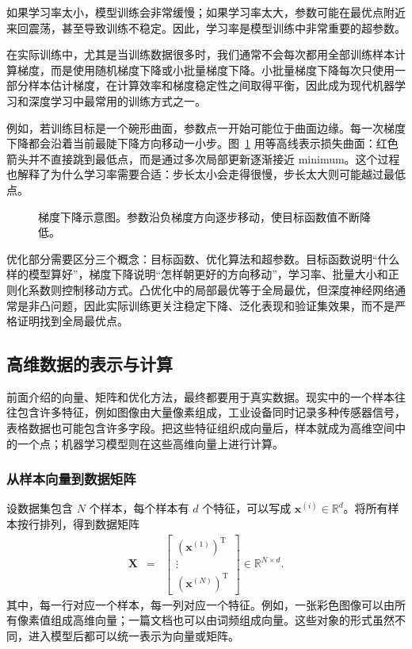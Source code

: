如果学习率太小，模型训练会非常缓慢；如果学习率太大，参数可能在最优点附近来回震荡，甚至导致训练不稳定。因此，学习率是模型训练中非常重要的超参数。

在实际训练中，尤其是当训练数据很多时，我们通常不会每次都用全部训练样本计算梯度，而是使用随机梯度下降或小批量梯度下降。小批量梯度下降每次只使用一部分样本估计梯度，在计算效率和梯度稳定性之间取得平衡，因此成为现代机器学习和深度学习中最常用的训练方式之一。

例如，若训练目标是一个碗形曲面，参数点一开始可能位于曲面边缘。每一次梯度下降都会沿着当前最陡下降方向移动一小步。图~\ref{fig:aml-gradient-descent} 用等高线表示损失曲面：红色箭头并不直接跳到最低点，而是通过多次局部更新逐渐接近 minimum。这个过程也解释了为什么学习率需要合适：步长太小会走得很慢，步长太大则可能越过最低点。

\begin{figure}[htbp]
  \centering
  
  \caption{梯度下降示意图。参数沿负梯度方向逐步移动，使目标函数值不断降低。}
  \label{fig:aml-gradient-descent}
\end{figure}

\begin{importantnote}
  优化部分需要区分三个概念：目标函数、优化算法和超参数。目标函数说明“什么样的模型算好”，梯度下降说明“怎样朝更好的方向移动”，学习率、批量大小和正则化系数则控制移动方式。凸优化中的局部最优等于全局最优，但深度神经网络通常是非凸问题，因此实际训练更关注稳定下降、泛化表现和验证集效果，而不是严格证明找到全局最优点。
\end{importantnote}

\subsection{高维数据的表示与计算}

前面介绍的向量、矩阵和优化方法，最终都要用于真实数据。现实中的一个样本往往包含许多特征，例如图像由大量像素组成，工业设备同时记录多种传感器信号，表格数据也可能包含许多字段。把这些特征组织成向量后，样本就成为高维空间中的一个点；机器学习模型则在这些高维向量上进行计算。

\subsubsection{从样本向量到数据矩阵}

设数据集包含 $N$ 个样本，每个样本有 $d$ 个特征，可以写成 $\mathbf{x}^{(i)}\in\mathbb{R}^{d}$。将所有样本按行排列，得到数据矩阵
\begin{eqnarray}
\mathbf{X}
& = &
\begin{bmatrix}
(\mathbf{x}^{(1)})^{\mathrm{T}}\\
\vdots\\
(\mathbf{x}^{(N)})^{\mathrm{T}}
\end{bmatrix}
\in\mathbb{R}^{N\times d}.
\end{eqnarray}
其中，每一行对应一个样本，每一列对应一个特征。例如，一张彩色图像可以由所有像素值组成高维向量；一篇文档也可以由词频组成向量。这些对象的形式虽然不同，进入模型后都可以统一表示为向量或矩阵。


